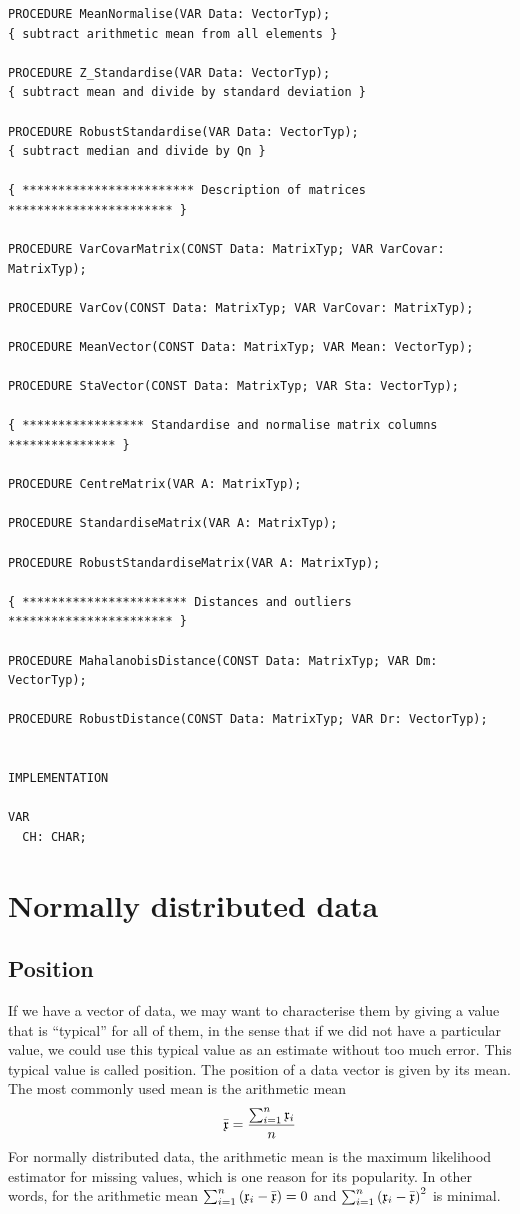 \begin{refsection}
\begin{lstlisting}[caption=Interface of descript]
PROCEDURE MeanNormalise(VAR Data: VectorTyp);
{ subtract arithmetic mean from all elements }

PROCEDURE Z_Standardise(VAR Data: VectorTyp);
{ subtract mean and divide by standard deviation }

PROCEDURE RobustStandardise(VAR Data: VectorTyp);
{ subtract median and divide by Qn }

{ ************************ Description of matrices *********************** }

PROCEDURE VarCovarMatrix(CONST Data: MatrixTyp; VAR VarCovar: MatrixTyp);

PROCEDURE VarCov(CONST Data: MatrixTyp; VAR VarCovar: MatrixTyp);

PROCEDURE MeanVector(CONST Data: MatrixTyp; VAR Mean: VectorTyp);

PROCEDURE StaVector(CONST Data: MatrixTyp; VAR Sta: VectorTyp);

{ ***************** Standardise and normalise matrix columns *************** }

PROCEDURE CentreMatrix(VAR A: MatrixTyp);

PROCEDURE StandardiseMatrix(VAR A: MatrixTyp);

PROCEDURE RobustStandardiseMatrix(VAR A: MatrixTyp);

{ *********************** Distances and outliers *********************** }

PROCEDURE MahalanobisDistance(CONST Data: MatrixTyp; VAR Dm: VectorTyp);

PROCEDURE RobustDistance(CONST Data: MatrixTyp; VAR Dr: VectorTyp);


IMPLEMENTATION

VAR
  CH: CHAR;
\end{lstlisting}

\section{Normally distributed data}

\subsection{Position}

If we have a vector of data, we may want to characterise them by giving a value that is ``typical'' for all of them, in the sense that if we did not have a particular value, we could use this typical value as an estimate without too much error. This typical value is called position. The position of a data vector is given by its mean.
The most commonly used mean is the arithmetic mean
\begin{equation}
  \bar{\mathfrak{x}} = \frac{\sum_{i=1}^n{\mathfrak{x}_i}}{n}
\end{equation}
For normally distributed data, the arithmetic mean is the maximum likelihood estimator for missing values, which is one reason for its popularity. In other words, for the arithmetic mean \( \sum_{i=1}^n{(\mathfrak{x}_i - \bar{\mathfrak{x}})} = 0 \) and \( \sum_{i=1}^n{(\mathfrak{x}_i - \bar{\mathfrak{x}})}^2 \) is minimal.


\end{refsection}
